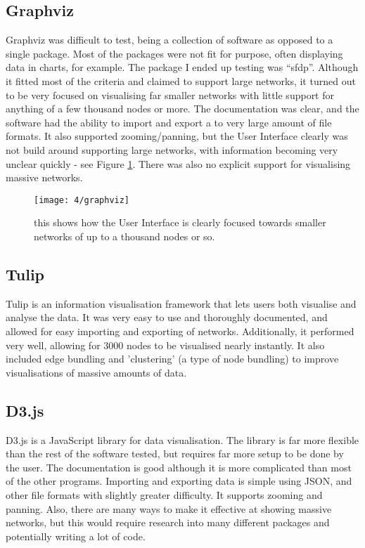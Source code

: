 \documentclass[../dissertation.tex]{subfiles}
\begin{document}
\subsection{Graphviz}

Graphviz was difficult to test, being a collection of software as opposed to a single package. Most of the packages were not fit for purpose, often displaying data in charts, for example. The package I ended up testing was ``sfdp''. Although it fitted most of the criteria and claimed to support large networks, it turned out to be very focused on visualising far smaller networks with little support for anything of a few thousand nodes or more. The documentation was clear, and the software had the ability to import and export a to very large amount of file formats. It also supported zooming/panning, but the User Interface clearly was not build around supporting large networks, with information becoming very unclear quickly - see Figure \ref{fig:graphviz}. There was also no explicit support for visualising massive networks.

\begin{figure}
    \centering
    \texttt{[image: 4/graphviz]}
    \caption{this shows how the User Interface is clearly focused towards smaller networks of up to a thousand nodes or so.}
    \label{fig:graphviz}
\end{figure}

\subsection{Tulip}

Tulip is an information visualisation framework that lets users both visualise and analyse the data. It was very easy to use and thoroughly documented, and allowed for easy importing and exporting of networks. Additionally, it performed very well, allowing for 3000 nodes to be visualised nearly instantly. It also included edge bundling and 'clustering' (a type of node bundling) to improve visualisations of massive amounts of data.

\subsection{D3.js}

D3.js is a JavaScript library for data visualisation. The library is far more flexible than the rest of the software tested, but requires far more setup to be done by the user. The documentation is good although it is more complicated than most of the other programs. Importing and exporting data is simple using JSON, and other file formats with slightly greater difficulty. It supports zooming and panning. Also, there are many ways to make it effective at showing massive networks, but this would require research into many different packages and potentially writing a lot of code.
\end{document}
